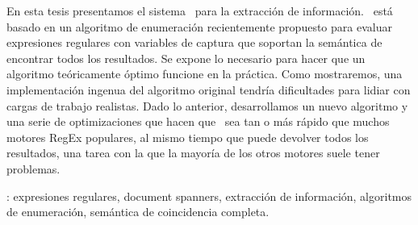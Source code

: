 En esta tesis presentamos el sistema \rematch\ para la extracción de
información. \rematch\ está basado en un algoritmo de enumeración recientemente
propuesto para evaluar expresiones regulares con variables de captura que
soportan la semántica de encontrar todos los resultados. Se expone lo necesario
para hacer que un algoritmo teóricamente óptimo funcione en la práctica. Como
mostraremos, una implementación ingenua del algoritmo original tendría
dificultades para lidiar con cargas de trabajo realistas. Dado lo anterior,
desarrollamos un nuevo algoritmo y una serie de optimizaciones que hacen que
\rematch\ sea tan o más rápido que muchos motores RegEx populares, al mismo
tiempo que puede devolver todos los resultados, una tarea con la que la mayoría
de los otros motores suele tener problemas. \

\vfill
{}: expresiones regulares, document spanners,
extracción de información, algoritmos de enumeración, semántica de coincidencia
completa.
